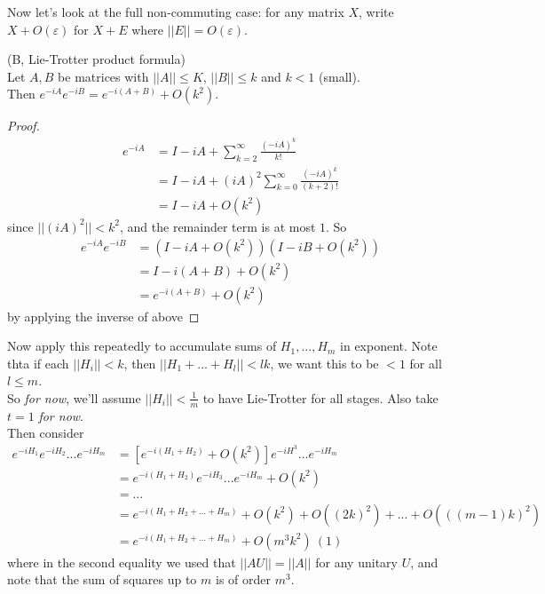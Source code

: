 \documentclass[a4paper]{article}
\begin{document}
Now let's look at the full non-commuting case: for any matrix $X$, write $X+O(\varepsilon)$ for $X+E$ where $||E|| = O(\varepsilon)$.

\begin{lemma} (B, Lie-Trotter product formula)\\
    Let $A,B$ be matrices with $||A|| \leq K$, $||B|| \leq k$ and $k<1$ (small).\\
    Then $e^{-iA} e^{-iB} = e^{-i(A+B)} + O(k^2)$.
    \begin{proof}
        \begin{equation*}
            \begin{aligned}
                e^{-iA} &= I-iA + \sum_{k=2}^\infty \frac{(-iA)^k}{k!}\\
                &= I-iA + (iA)^2 \sum_{k=0}^\infty \frac{(-iA)^k}{(k+2)!}\\
                &= I-iA + O(k^2)
            \end{aligned}
        \end{equation*}
        since $||(iA)^2|| < k^2$, and the remainder term is at most $1$. So
        \begin{equation*}
            \begin{aligned}
                e^{-iA} e^{-iB} &= (I-iA + O(k^2)) (I-iB + O(k^2))\\
                &= I-i(A+B) + O(k^2)\\
                &= e^{-i(A+B)} + O(k^2)
            \end{aligned}
        \end{equation*}
        by applying the inverse of above
    \end{proof}
\end{lemma}
Now apply this repeatedly to accumulate sums of $H_1,...,H_m$ in exponent. Note thta if each $||H_i|| < k$, then $||H_1+...+H_l|| < lk$, we want this to be $<1$ for all $l\leq m$.\\
So \emph{for now}, we'll assume $||H_i|| < \frac{1}{m}$ to have Lie-Trotter for all stages. Also take $t=1$ \emph{for now}.\\
Then consider
\begin{equation*}
    \begin{aligned}
        e^{-iH_1} e^{-iH_2}...e^{-iH_m} &= \left[e^{-i(H_1+H_2)}+O(k^2)\right] e^{-iH^3} ... e^{-iH_m}\\
        &= e^{-i(H_1+H_2)} e^{-iH_3} ... e^{-iH_m} + O(k^2)\\
        &= ...\\
        &= e^{-i(H_1+H_2+...+H_m)} +O(k^2)+O((2k)^2)+...+O(((m-1)k)^2)\\
        &= e^{-i(H_1+H_2+...+H_m)} + O(m^3k^2)\ (1)
    \end{aligned}
\end{equation*}
where in the second equality we used that $||AU|| = ||A||$ for any unitary $U$, and note that the sum of squares up to $m$ is of order $m^3$.
\end{document}
